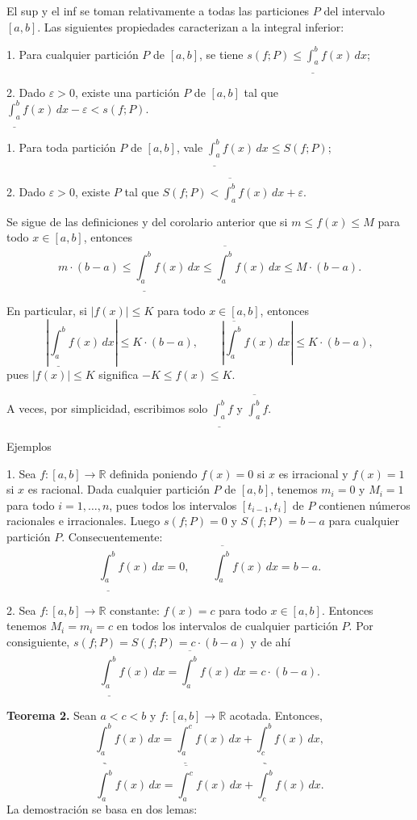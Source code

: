 \documentclass[12pt,oneside]{book}
\begin{document}
El sup y el inf se toman relativamente a todas las particiones \(P\) del intervalo \([a, b]\). Las siguientes propiedades caracterizan a la integral inferior:

1. Para cualquier partición \(P\) de \([a, b]\), se tiene \(s(f; P) \leq \underline{\int_a^b} f(x)\,dx\);

2. Dado \(\varepsilon > 0\), existe una partición \(P\) de \([a, b]\) tal que \(\underline{\int_a^b} f(x)\,dx - \varepsilon < s(f; P)\).

1. Para toda partición \(P\) de \([a, b]\), vale \(\underline{\int_a^b} f(x) \, dx \leq S(f; P)\);

2. Dado \(\varepsilon > 0\), existe \(P\) tal que \(S(f; P) < \overline{\int_a^b} f(x) \, dx + \varepsilon\).

Se sigue de las definiciones y del corolario anterior que si \(m \leq f(x) \leq M\) para todo \(x \in [a, b]\), entonces
\[
m \cdot (b - a) \leq \underline{\int_a^b} f(x) \, dx \leq \overline{\int_a^b} f(x) \, dx \leq M \cdot (b - a).
\]

En particular, si \(|f(x)| \leq K\) para todo \(x \in [a, b]\), entonces
\[
\left| \underline{\int_a^b} f(x) \, dx \right| \leq K \cdot (b - a), \qquad \left| \overline{\int_a^b} f(x) \, dx \right| \leq K \cdot (b - a),
\]
pues \(|f(x)| \leq K\) significa \(-K \leq f(x) \leq K\).

A veces, por simplicidad, escribimos solo \(\underline{\int_a^b} f\) y \(\overline{\int_a^b} f\).

Ejemplos

1. Sea \(f: [a, b] \to \mathbb{R}\) definida poniendo \(f(x) = 0\) si \(x\) es irracional y \(f(x) = 1\) si \(x\) es racional. Dada cualquier partición \(P\) de \([a, b]\), tenemos \(m_i = 0\) y \(M_i = 1\) para todo \(i = 1, \ldots, n\), pues todos los intervalos \([t_{i-1}, t_i]\) de \(P\) contienen números racionales e irracionales. Luego \(s(f; P) = 0\) y \(S(f; P) = b - a\) para cualquier partición \(P\). Consecuentemente:
\[
\underline{\int_a^b} f(x) \, dx = 0, \qquad \overline{\int_a^b} f(x) \, dx = b - a.
\]

2. Sea \(f: [a, b] \to \mathbb{R}\) constante: \(f(x) = c\) para todo \(x \in [a, b]\). Entonces tenemos \(M_i = m_i = c\) en todos los intervalos de cualquier partición \(P\). Por consiguiente, \(s(f; P) = S(f; P) = c \cdot (b - a)\) y de ahí
\[
\underline{\int_a^b} f(x) \, dx = \overline{\int_a^b} f(x) \, dx = c \cdot (b - a).
\]

\textbf{Teorema 2.} Sean \(a < c < b\) y \(f: [a, b] \to \mathbb{R}\) acotada. Entonces,
\[
\underline{\int_a^b} f(x) \, dx = \underline{\int_a^c} f(x) \, dx + \underline{\int_c^b} f(x) \, dx,
\]
\[
\overline{\int_a^b} f(x) \, dx = \overline{\int_a^c} f(x) \, dx + \overline{\int_c^b} f(x) \, dx.
\]
La demostración se basa en dos lemas:
\end{document}
